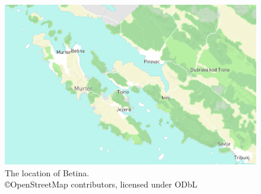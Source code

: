 \documentclass[output=paper]{LSP/langsci}
\begin{document}
\begin{figure}
\includegraphics[width=\textwidth]{illustrations/skevin_betinalocation3.png}
\caption{The location of Betina.\\  {\tiny ©OpenStreetMap contributors, licensed under ODbL}}
\label{fig:skevin:betinalocation} 
\end{figure}
\end{document}
